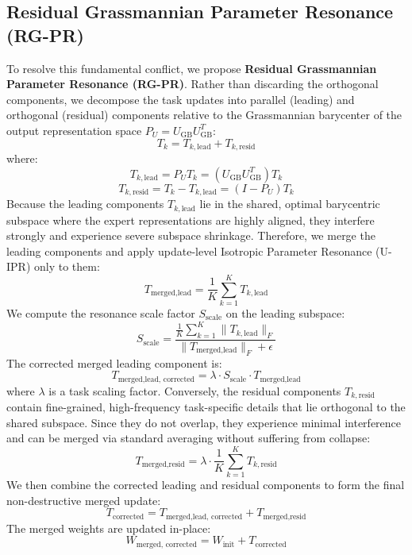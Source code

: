 \documentclass{article}
\theoremstyle{plain}
\theoremstyle{definition}
\theoremstyle{remark}
\begin{document}
\subsection{Residual Grassmannian Parameter Resonance (RG-PR)}
To resolve this fundamental conflict, we propose \textbf{Residual Grassmannian Parameter Resonance (RG-PR)}. Rather than discarding the orthogonal components, we decompose the task updates into parallel (leading) and orthogonal (residual) components relative to the Grassmannian barycenter of the output representation space $P_U = U_{\text{GB}} U_{\text{GB}}^T$:
\begin{equation}
    T_k = T_{k, \text{lead}} + T_{k, \text{resid}}
\end{equation}
where:
\begin{equation}
    T_{k, \text{lead}} = P_U T_k = (U_{\text{GB}} U_{\text{GB}}^T) T_k
\end{equation}
\begin{equation}
    T_{k, \text{resid}} = T_k - T_{k, \text{lead}} = (I - P_U) T_k
\end{equation}
Because the leading components $T_{k, \text{lead}}$ lie in the shared, optimal barycentric subspace where the expert representations are highly aligned, they interfere strongly and experience severe subspace shrinkage. Therefore, we merge the leading components and apply update-level Isotropic Parameter Resonance (U-IPR) only to them:
\begin{equation}
    T_{\text{merged}, \text{lead}} = \frac{1}{K} \sum_{k=1}^K T_{k, \text{lead}}
\end{equation}
We compute the resonance scale factor $S_{\text{scale}}$ on the leading subspace:
\begin{equation}
    S_{\text{scale}} = \frac{\frac{1}{K} \sum_{k=1}^K \| T_{k, \text{lead}} \|_F}{\| T_{\text{merged}, \text{lead}} \|_F + \epsilon}
\end{equation}
The corrected merged leading component is:
\begin{equation}
    T_{\text{merged}, \text{lead, corrected}} = \lambda \cdot S_{\text{scale}} \cdot T_{\text{merged}, \text{lead}}
\end{equation}
where $\lambda$ is a task scaling factor.
Conversely, the residual components $T_{k, \text{resid}}$ contain fine-grained, high-frequency task-specific details that lie orthogonal to the shared subspace. Since they do not overlap, they experience minimal interference and can be merged via standard averaging without suffering from collapse:
\begin{equation}
    T_{\text{merged}, \text{resid}} = \lambda \cdot \frac{1}{K} \sum_{k=1}^K T_{k, \text{resid}}
\end{equation}
We then combine the corrected leading and residual components to form the final non-destructive merged update:
\begin{equation}
    T_{\text{corrected}} = T_{\text{merged}, \text{lead, corrected}} + T_{\text{merged}, \text{resid}}
\end{equation}
The merged weights are updated in-place:
\begin{equation}
    W_{\text{merged, corrected}} = W_{\text{init}} + T_{\text{corrected}}
\end{equation}
\end{document}
